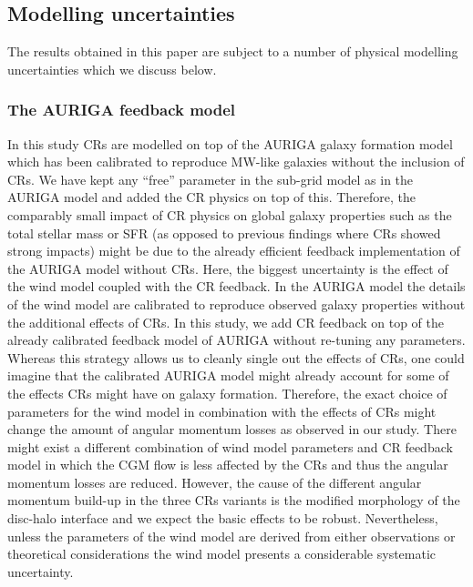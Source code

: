 \documentclass[useAMS,usenatbib]{mnras}
\begin{document}
\subsection{Modelling uncertainties}
The results obtained in this paper are subject to a number of physical modelling uncertainties which we discuss below.

\subsubsection{The AURIGA feedback model}
In this study CRs are modelled on top of the AURIGA galaxy formation model which has been calibrated to reproduce MW-like galaxies without the inclusion of CRs. We have kept any ``free'' parameter in the sub-grid model as in the AURIGA model and added the CR physics on top of this. Therefore, the comparably small impact of CR physics on global galaxy properties such as the total stellar mass or SFR (as opposed to previous findings where CRs showed strong impacts) might be due to the already efficient feedback implementation of the AURIGA model without CRs. Here, the biggest uncertainty is the effect of the wind model coupled with the CR feedback. In the AURIGA model the details of the wind model are calibrated to reproduce observed galaxy properties without the additional effects of CRs. In this study, we add CR feedback on top of the already calibrated feedback model of AURIGA without re-tuning any parameters. Whereas this strategy allows us to cleanly single out the effects of CRs, one could imagine that the calibrated AURIGA model might already account for some of the effects CRs might have on galaxy formation. Therefore, the exact choice of parameters for the wind model in combination with the effects of CRs might change the amount of angular momentum losses as observed in our study. There might exist a different combination of wind model parameters and CR feedback model in which the CGM flow is less affected by the CRs and thus the angular momentum losses are reduced. However, the cause of the different angular momentum build-up in the three CRs variants is the modified morphology of the disc-halo interface and we expect the basic effects to be robust. Nevertheless, unless the parameters of the wind model are derived from either observations or theoretical considerations the wind model presents a considerable systematic uncertainty.
\end{document}
